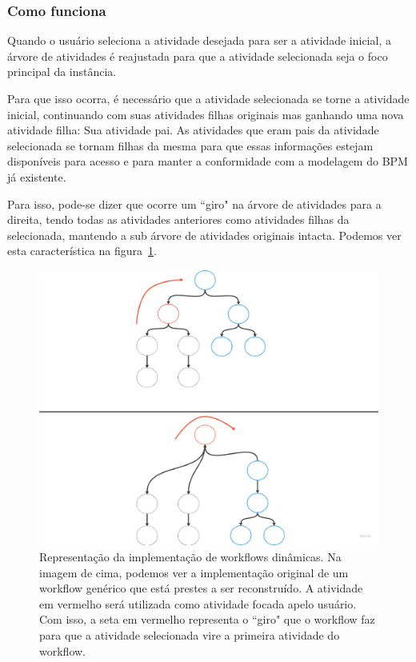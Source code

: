 \subsubsection{Como funciona}

Quando o usuário seleciona a atividade desejada para ser a atividade inicial, a árvore de atividades é reajustada para que a atividade selecionada seja o foco principal da instância.

Para que isso ocorra, é necessário que a atividade selecionada se torne a atividade inicial, continuando com suas atividades filhas originais mas ganhando uma nova atividade filha: Sua atividade pai. As atividades que eram pais da atividade selecionada se tornam filhas da mesma para que essas informações estejam disponíveis para acesso e para manter a conformidade com a modelagem do BPM já existente.

Para isso, pode-se dizer que ocorre um ``giro" na árvore de atividades para a direita, tendo todas as atividades anteriores como atividades filhas da selecionada, mantendo a sub árvore de atividades originais intacta. Podemos ver esta característica na figura~\ref{fig:primeira_implementacao}.

\begin{figure}
    \centering
    \includegraphics[width=1\textwidth]{imgs/Implementacoes/primeiraImplementacao.png}
    \caption{Representação da implementação de workflows dinâmicas. Na imagem de cima, podemos ver a implementação original de um workflow genérico que está prestes a ser reconstruído. A atividade em vermelho será utilizada como atividade focada apelo usuário. Com isso, a seta em vermelho representa o ``giro" que o workflow faz para que a atividade selecionada vire a primeira atividade do workflow.}
    \label{fig:primeira_implementacao}
\end{figure}

